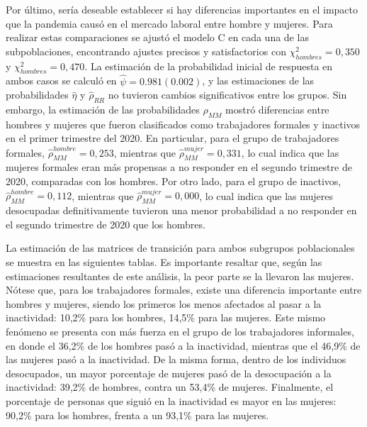 \documentclass[
  12pt,
]{book}
\begin{document}
Por último, sería deseable establecer si hay diferencias importantes en el impacto que la pandemia causó en el mercado laboral entre hombre y mujeres. Para realizar estas comparaciones se ajustó el modelo C en cada una de las subpoblaciones, encontrando ajustes precisos y satisfactorios con \(\chi^2_{hombres} = 0,350\) y \(\chi^2_{hombres} = 0,470\). La estimación de la probabilidad inicial de respuesta en ambos casos se calculó en \(\hat{\psi}=0.981 (0.002)\), y las estimaciones de las probabilidades \(\hat{\eta}\) y \(\hat{\rho}_{RR}\) no tuvieron cambios significativos entre los grupos. Sin embargo, la estimación de las probabilidades \(\hat{\rho}_{MM}\) mostró diferencias entre hombres y mujeres que fueron clasificados como trabajadores formales y inactivos en el primer trimestre del 2020. En particular, para el grupo de trabajadores formales, \(\hat{\rho}_{MM}^{hombre} = 0,253\), mientras que \(\hat{\rho}_{MM}^{mujer} = 0,331\), lo cual indica que las mujeres formales eran más propensas a no responder en el segundo trimestre de 2020, comparadas con los hombres. Por otro lado, para el grupo de inactivos, \(\hat{\rho}_{MM}^{hombre} = 0,112\), mientras que \(\hat{\rho}_{MM}^{mujer} = 0,000\), lo cual indica que las mujeres desocupadas definitivamente tuvieron una menor probabilidad a no responder en el segundo trimestre de 2020 que los hombres.

La estimación de las matrices de transición para ambos subgrupos poblacionales se muestra en las siguientes tablas. Es importante resaltar que, según las estimaciones resultantes de este análisis, la peor parte se la llevaron las mujeres. Nótese que, para los trabajadores formales, existe una diferencia importante entre hombres y mujeres, siendo los primeros los menos afectados al pasar a la inactividad: 10,2\% para los hombres, 14,5\% para las mujeres. Este mismo fenómeno se presenta con más fuerza en el grupo de los trabajadores informales, en donde el 36,2\% de los hombres pasó a la inactividad, mientras que el 46,9\% de las mujeres pasó a la inactividad. De la misma forma, dentro de los individuos desocupados, un mayor porcentaje de mujeres pasó de la desocupación a la inactividad: 39,2\% de hombres, contra un 53,4\% de mujeres. Finalmente, el porcentaje de personas que siguió en la inactividad es mayor en las mujeres: 90,2\% para los hombres, frenta a un 93,1\% para las mujeres.
\end{document}
